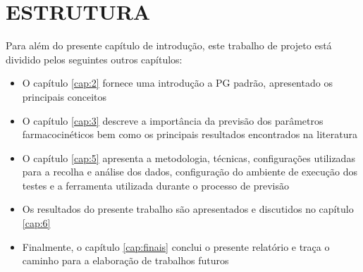 \section{ESTRUTURA}
\label{sec:estrutura}

Para além do presente capítulo de introdução, este trabalho de projeto está dividido pelos seguintes outros capítulos:

\begin{itemize}
\item{O capítulo \ref{cap:2} fornece uma introdução a \ac{PG} padrão, %
apresentado os principais conceitos}
\item{O capítulo \ref{cap:3} descreve a importância da previsão dos parâmetros farmacocinéticos bem como os principais 
resultados encontrados na literatura}
\item{O capítulo \ref{cap:5} apresenta a metodologia, técnicas, configurações utilizadas para a recolha e análise dos dados, configuração do ambiente de execução dos testes e a ferramenta utilizada durante o processo de previsão
}
\item{Os resultados do presente trabalho são apresentados e discutidos no capítulo \ref{cap:6} 
}
\item{Finalmente, o capítulo \ref{cap:finais} conclui o presente relatório e traça o caminho para a elaboração de trabalhos futuros
}
\end{itemize}